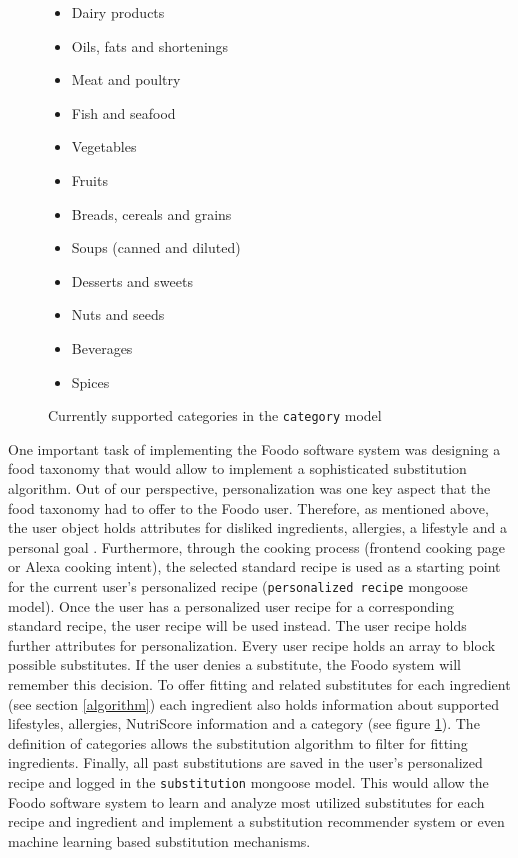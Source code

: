 \begin{figure}[ht]
	\captionsetup{justification=centering}
	\begin{center}
	\begin{itemize} 
		\itemsep-0.5em 
		\item Dairy products
		\item Oils, fats and shortenings	
		\item Meat and poultry	
		\item Fish and seafood
		\item Vegetables	
		\item Fruits	
		\item Breads, cereals and grains	
		\item Soups (canned and diluted)	
		\item Desserts and sweets	
		\item Nuts and seeds	
		\item Beverages
		\item Spices
	\end{itemize}
	\caption{Currently supported categories in the \texttt{category} model}
	\label{categories}
	\end{center}
\end{figure}


One important task of implementing the Foodo software system was designing a food taxonomy that would allow to implement a sophisticated substitution algorithm. Out of our perspective, personalization was one key aspect that the food taxonomy had to offer to the Foodo user. Therefore, as mentioned above, the user object holds attributes for disliked ingredients, allergies, a lifestyle and a personal goal . Furthermore, through the cooking process (frontend cooking page or Alexa cooking intent), the selected standard recipe is used as a starting point for the current user's personalized recipe (\texttt{personalized recipe} mongoose model). Once the user has a personalized user recipe for a corresponding standard recipe, the user recipe will be used instead. The user recipe holds further attributes for personalization. Every user recipe holds an array to block possible substitutes. If the user denies a substitute, the Foodo system will remember this decision. To offer fitting and related substitutes for each ingredient (see section \ref{algorithm}) each ingredient also holds information about supported lifestyles, allergies, NutriScore information and a category (see figure \ref{categories}). The definition of categories allows the substitution algorithm to filter for fitting ingredients. Finally, all past substitutions are saved in the user's personalized recipe and logged in the \texttt{substitution} mongoose model. This would allow the Foodo software system to learn and analyze most utilized substitutes for each recipe and ingredient and implement a substitution recommender system or even machine learning based substitution mechanisms. 

